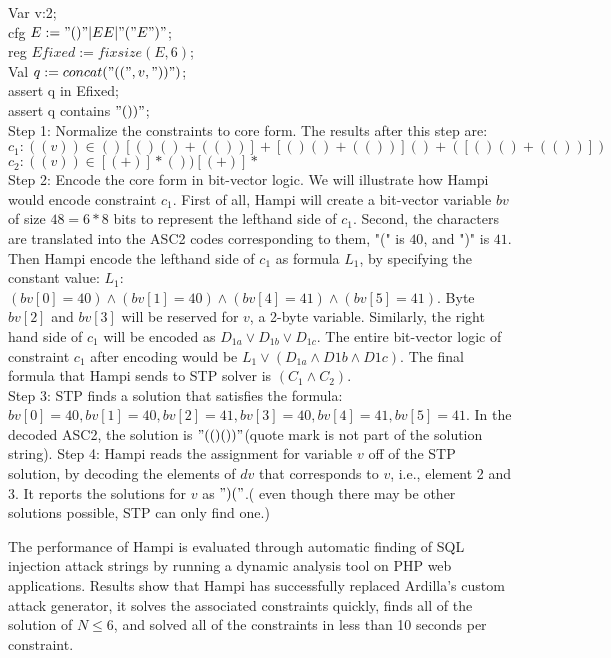 \indent Var v:2;\\
\indent cfg $E := "()"|EE|"("E")"$;\\
\indent reg $Efixed := fixsize(E, 6)$;\\
\indent Val $q := concat("((",v,"))")$;\\
\indent assert q in Efixed;\\
\indent assert q contains $"())"$;\\

\noindent Step 1: Normalize the constraints to core form. The results after this step are:\\ 
$c_1: ((v))\in ()[()()+(())]+[()()+(())]()+([()()+(())])$\\
$c_2: ((v))\in [(+)]*())[(+)]*$\\
\noindent Step 2: Encode the core form in bit-vector logic. We will illustrate how Hampi would encode constraint $c_1$. First of all, Hampi will create a bit-vector variable $bv$ of size $48=6*8$ bits to represent the lefthand side of $c_1$. Second, the characters are translated into the ASC2 codes corresponding to them, "(" is $40$, and ")" is $41$. Then Hampi encode the lefthand side of $c_1$ as formula $L_1$, by specifying the constant value: $L_1$: $(bv[0]=40)\wedge (bv[1]=40)\wedge (bv[4]=41) \wedge (bv[5]=41)$. Byte $bv[2]$ and $bv[3]$ will be reserved for $v$, a 2-byte variable. Similarly, the right hand side of $c_1$ will be encoded as $D_{1a}\vee D_{1b}\vee D_{1c}$. The entire bit-vector logic of constraint $c_1$ after encoding would be $L_1\vee(D_{1a}\wedge D{1b}\wedge D{1c})$. The final formula that Hampi sends to STP solver is $(C_1\wedge C_2)$.\\
\noindent Step 3: STP finds a solution that satisfies the formula: $bv[0]=40, bv[1]=40, bv[2]=41, bv[3]=40, bv[4]=41, bv[5]=41$. In the decoded ASC2, the solution is $"(()())"$(quote mark is not part of the solution string).
\noindent Step 4: Hampi reads the assignment for variable $v$ off of the STP solution, by decoding the elements of $dv$ that corresponds to $v$, i.e., element 2 and 3. It reports the solutions for $v$ as $")("$.( even though there may be other solutions possible, STP can only find one.)

The performance of Hampi is evaluated through automatic finding of SQL injection attack strings by running a dynamic analysis tool on PHP web applications. Results show that Hampi has successfully replaced Ardilla\cite{}'s custom attack generator, it solves the associated constraints quickly, finds all of the solution of $N\leq 6$, and solved all of the constraints in less than 10 seconds per constraint. 